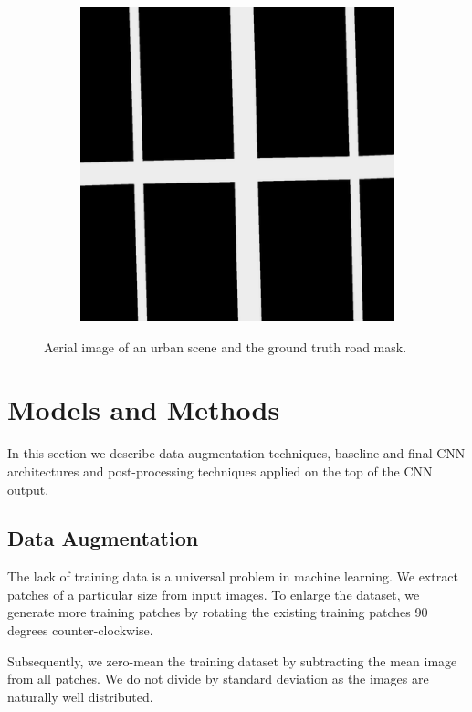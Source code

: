 \documentclass[10pt,conference,compsocconf]{IEEEtran}
\begin{document}
\begin{figure}
\begin{subfigure}{.2\textwidth}
		\includegraphics[width=1\textwidth]{figs/groundtruth1.png}
	\end{subfigure}
	\caption{Aerial image of an urban scene and the ground truth road mask.}
	\label{fig:intro_example}
\end{figure}

\section{Models and Methods}
\label{sec:MM}
In this section we describe data augmentation techniques, baseline and final CNN architectures and post-processing techniques applied on the top of the CNN output.

\subsection{Data Augmentation}
\label{subsec:preprocessing}
The lack of training data is a universal problem in machine learning. We extract patches of a particular size from input images. To enlarge the dataset, we generate more training patches by rotating the existing training patches 90 degrees counter-clockwise.

Subsequently, we zero-mean the training dataset by subtracting the mean image from all patches. We do not divide by standard deviation as the images are naturally well distributed.
\end{document}
